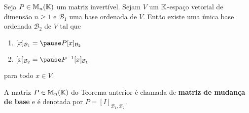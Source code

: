 \documentclass{beamer}
\begin{document}
\begin{frame}
    \begin{teorema}\label{teorema_matriz_mudanca_base}
        Seja $P \in \mathbb{M}_n(\mathbb{K})$ um matriz invertível. \pause Sejam $V$ um $\mathbb{K}$-espaço vetorial de dimensão $n \ge 1$ \pause e $\mathcal{B}_1$ uma base ordenada de $V$. \pause Então existe uma única base ordenada $\mathcal{B}_2$ \pause de $V$ tal que\pause
        \begin{enumerate}[label={\roman*})]
            \item $[x]_{\mathcal{B}_1} = \pause P[x]_{\mathcal{B}_2}$\pause
            
            \item $[x]_{\mathcal{B}_2} = \pause P^{-1}[x]_{\mathcal{B}_1}$\pause
        \end{enumerate}
    para todo $x \in V$.
\end{teorema}
\end{frame}

\begin{frame}
    \begin{definicao}
        A matriz $P \in \mathbb{M}_n(\mathbb{K})$ \pause do Teorema anterior \pause é chamada de \textbf{matriz de mudança de base} \pause e é denotada por $P = [I]_{{\mathcal{B}_1},{\mathcal{B}_2}}$.
    \end{definicao}
\end{frame}
\end{document}
